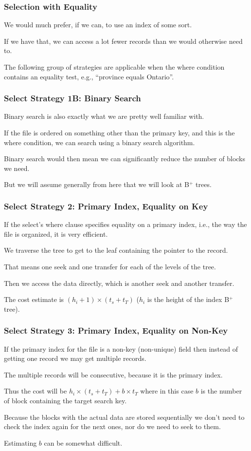 \begin{frame}
\frametitle{Selection with Equality}

We would much prefer, if we can, to use an index of some sort.

If we have that, we can access a lot fewer records than we would otherwise need to. 

The following group of strategies are applicable when the where condition contains an equality test, e.g., ``province equals Ontario''.

\end{frame}


\begin{frame}
\frametitle{Select Strategy 1B: Binary Search}

Binary search is also exactly what we are pretty well familiar with. 

If the file is ordered on something other than the primary key, and this is the where condition, we can search using a binary search algorithm. 

Binary search would then mean we can significantly reduce the number of blocks we need. 

But we will assume generally from here that we will look at B$^{+}$ trees.

\end{frame}

\begin{frame}
\frametitle{Select Strategy 2: Primary Index, Equality on Key}

If the select's where clause specifies equality on a primary index, i.e., the way the file is organized, it is very efficient. 

We traverse the tree to get to the leaf containing the pointer to the record. 

That means one seek and one transfer for each of the levels of the tree. 

Then we access the data directly, which is another seek and another transfer. 

The cost estimate is $(h_{i} + 1) \times (t_{s} + t_{T})$  ($h_{i}$ is the height of the index B$^{+}$ tree).

\end{frame}


\begin{frame}
\frametitle{Select Strategy 3: Primary Index, Equality on Non-Key}

If the primary index for the file is a non-key (non-unique) field then instead of getting one record we may get multiple records. 


The multiple records will be consecutive, because it is the primary index. 

Thus the cost will be $h_{i} \times (t_{s} + t_{T}) + b \times t_{T}$ where in this case $b$ is the number of block containing the target search key.

 Because the blocks with the actual data are stored sequentially we don't need to check the index again for the next ones, nor do we need to seek to them.
 
 Estimating $b$ can be somewhat difficult.

\end{frame}

